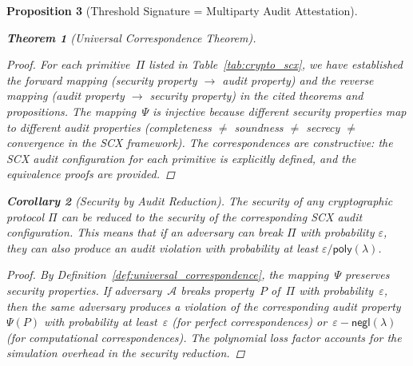 \documentclass[12pt,a4paper]{article}
\newtheorem{theorem}{Theorem}[section]
\newtheorem{proposition}[theorem]{Proposition}
\newtheorem{corollary}[theorem]{Corollary}
\theoremstyle{remark}
\newcommand{\SCX}{\textsf{SCX}}
\newcommand{\Adv}{\mathcal{A}}
\newcommand{\negl}{\textsf{negl}}
\newcommand{\poly}{\textsf{poly}}
\begin{document}
\begin{proposition}[Threshold Signature = Multiparty Audit Attestation]
\begin{theorem}[Universal Correspondence Theorem]
\begin{proof}
For each primitive~$\Pi$ listed in Table~\ref{tab:crypto_scx}, we have established the forward mapping (security property $\to$ audit property) and the reverse mapping (audit property $\to$ security property) in the cited theorems and propositions. The mapping~$\Psi$ is injective because different security properties map to different audit properties (completeness $\neq$ soundness $\neq$ secrecy $\neq$ convergence in the SCX framework). The correspondences are constructive: the SCX audit configuration for each primitive is explicitly defined, and the equivalence proofs are provided.
\end{proof}
\end{theorem}

\begin{corollary}[Security by Audit Reduction]
\label{cor:security_by_audit}
The security of any cryptographic protocol $\Pi$ can be reduced to the security of the corresponding \SCX{} audit configuration. This means that if an adversary can break $\Pi$ with probability $\varepsilon$, they can also produce an audit violation with probability at least $\varepsilon / \poly(\lambda)$.

\begin{proof}
By Definition~\ref{def:universal_correspondence}, the mapping~$\Psi$ preserves security properties. If adversary~$\Adv$ breaks property~$P$ of~$\Pi$ with probability~$\varepsilon$, then the same adversary produces a violation of the corresponding audit property~$\Psi(P)$ with probability at least~$\varepsilon$ (for perfect correspondences) or~$\varepsilon - \negl(\lambda)$ (for computational correspondences). The polynomial loss factor accounts for the simulation overhead in the security reduction.
\end{proof}
\end{corollary}


\end{proposition}
\end{document}
